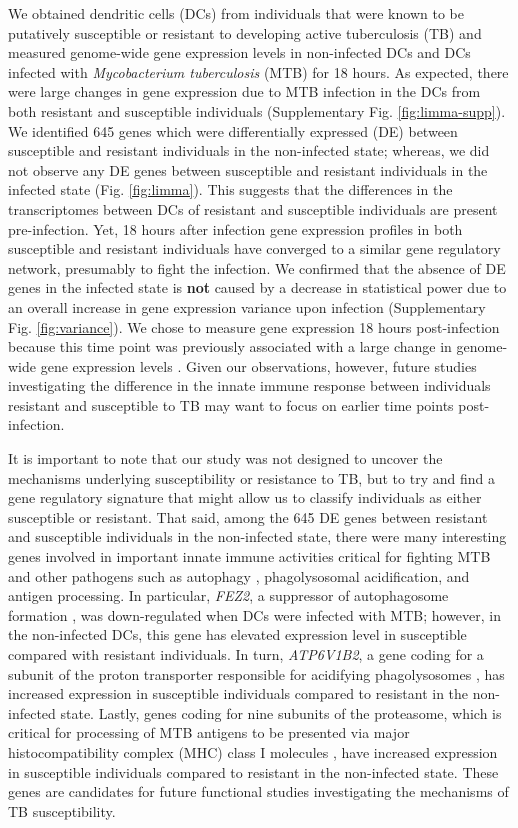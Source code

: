 \documentclass[fleqn,10pt]{wlscirep}
\begin{document}
We obtained dendritic cells (DCs) from individuals that were known to
be putatively susceptible or resistant to developing active
tuberculosis (TB) and measured genome-wide gene expression levels in
non-infected DCs and DCs infected with \emph{Mycobacterium
tuberculosis} (MTB) for 18 hours. As expected, there were large
changes in gene expression due to MTB infection in the DCs from both
resistant and susceptible individuals (Supplementary Fig.
\ref{fig:limma-supp}). We identified 645 genes which were
differentially expressed (DE) between susceptible and resistant
individuals in the non-infected state; whereas, we did not observe any
DE genes between susceptible and resistant individuals in the infected
state (Fig. \ref{fig:limma}). This suggests that the differences in
the transcriptomes between DCs of resistant and susceptible
individuals are present pre-infection. Yet, 18 hours after infection
gene expression profiles in both susceptible and resistant individuals
have converged to a similar gene regulatory network, presumably to
fight the infection. We confirmed that the absence of DE genes in the
infected state is \textbf{not} caused by a decrease in statistical
power due to an overall increase in gene expression variance upon
infection (Supplementary Fig. \ref{fig:variance}). We chose to measure
gene expression 18 hours post-infection because this time point was
previously associated with a large change in genome-wide gene
expression levels \cite{Tailleux2008}. Given our observations,
however, future studies investigating the difference in the innate
immune response between individuals resistant and susceptible to TB
may want to focus on earlier time points post-infection.

It is important to note that our study was not designed to uncover the
mechanisms underlying susceptibility or resistance to TB, but to try
and find a gene regulatory signature that might allow us to classify
individuals as either susceptible or resistant. That said, among the
645 DE genes between resistant and susceptible individuals in the
non-infected state, there were many interesting genes involved in
important innate immune activities critical for fighting MTB and other
pathogens such as autophagy \cite{Deretic2014, Castrejon-Jimenez2015},
phagolysosomal acidification, and antigen processing. In particular,
\emph{FEZ2}, a suppressor of autophagosome formation \cite{Spang2014},
was down-regulated when DCs were infected with MTB; however, in the
non-infected DCs, this gene has elevated expression level in
susceptible compared with resistant individuals. In turn,
\emph{ATP6V1B2}, a gene coding for a subunit of the proton transporter
responsible for acidifying phagolysosomes \cite{Sturgill-Koszycki1994,
Hornef2002, Hestvik2005}, has increased expression in susceptible
individuals compared to resistant in the non-infected state. Lastly,
genes coding for nine subunits of the proteasome, which is critical
for processing of MTB antigens to be presented via major
histocompatibility complex (MHC) class I molecules \cite{Flynn1992,
Grotzke2009, Grotzke2010, LindestamArlehamn2014}, have increased
expression in susceptible individuals compared to resistant in the
non-infected state. These genes are candidates for future functional
studies investigating the mechanisms of TB susceptibility.
\end{document}
